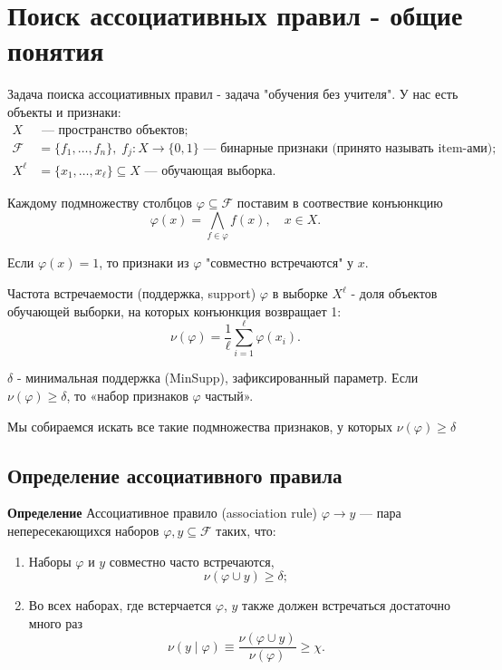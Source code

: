 \section{Поиск ассоциативных правил - общие понятия}
Задача поиска ассоциативных правил - задача "обучения без учителя". У нас есть объекты и признаки:
\begin{align*}
X & \text{ — пространство объектов;} \\
\mathcal{F} &= \{f_1, \ldots, f_n\}, \; f_j: X \rightarrow \{0, 1\} \text{ — бинарные признаки (принято называть item-ами);} \\
X^\ell &= \{x_1, \ldots, x_\ell\} \subseteq X \text{ — обучающая выборка.}
\end{align*}

Каждому подмножеству столбцов $\varphi \subseteq \mathcal{F}$ поставим в соотвествие конъюнкцию
\[
\varphi(x) = \bigwedge_{f \in \varphi} f(x), \quad x \in X.
\]

Если $\varphi(x) = 1$, то признаки из $\varphi$ "совместно встречаются" у $x$.

Частота встречаемости (поддержка, support) $\varphi$ в выборке $X^\ell$ - доля объектов обучающей выборки, на которых конъюнкция возвращает 1:
\[
\nu(\varphi) = \frac{1}{\ell} \sum_{i=1}^\ell \varphi(x_i).
\]

$\delta$ - минимальная поддержка (MinSupp), зафиксированный параметр. Если $\nu(\varphi) \geq \delta$, то «набор признаков $\varphi$ частый».

Мы собираемся искать все такие подмножества признаков, у которых $\nu(\varphi) \geq \delta$
\newline

\subsection{Определение ассоциативного правила}
\textbf{Определение}
Ассоциативное правило (association rule) $\varphi \rightarrow y$ — пара непересекающихся наборов $\varphi, y \subseteq \mathcal{F}$ таких, что:
\begin{enumerate}
    \item Наборы $\varphi$ и $y$ совместно часто встречаются,
    \[
    \nu(\varphi \cup y) \geq \delta;
    \]
    \item Во всех наборах, где встерчается $\varphi$, $y$ также должен встречаться достаточно много раз
    \[
    \nu(y \mid \varphi) \equiv \frac{\nu(\varphi \cup y)}{\nu(\varphi)} \geq \chi.
    \]


\end{enumerate}

